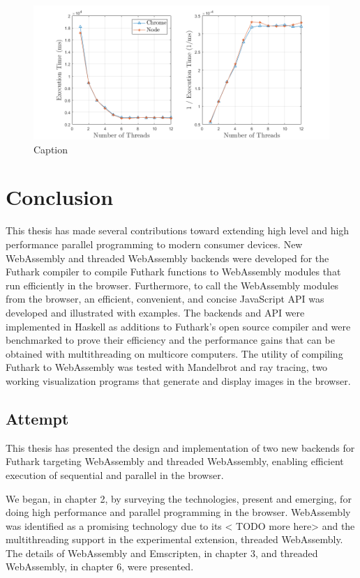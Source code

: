 \documentclass[11pt]{book}
\begin{document}
\begin{figure}
    \centering
    \includegraphics[width=\textwidth]{figures/execution_time.png}
    \caption{Caption}
    \label{fig:benchtime}
\end{figure}
\chapter{Conclusion}

This thesis has made several contributions toward extending high level and high performance parallel programming to modern consumer devices.
New WebAssembly and threaded WebAssembly backends were developed for the Futhark compiler to compile Futhark functions to WebAssembly modules that run efficiently in the browser. Furthermore, to call the WebAssembly modules from the browser, an efficient, convenient, and concise JavaScript API was developed and illustrated with examples. 
The backends and API were implemented in Haskell as additions to Futhark’s open source compiler and were benchmarked to prove their efficiency and the performance gains that can be obtained with multithreading on multicore computers.
The utility of compiling Futhark to WebAssembly was tested with Mandelbrot and ray tracing, two working visualization programs that generate and display images in the browser.
\newpage
\section{Attempt}

This thesis has presented the design and implementation of two new backends for Futhark targeting WebAssembly and threaded WebAssembly, enabling efficient execution of sequential and parallel in the browser. 

We began, in chapter 2, by surveying the technologies, present and emerging, for doing high performance and parallel programming in the browser. WebAssembly was identified as a promising technology due to its <{\color{red} TODO} more here> and the multithreading support in the experimental extension, threaded WebAssembly. The details of WebAssembly and Emscripten, in chapter 3, and threaded WebAssembly, in chapter 6, were presented.
\end{document}
